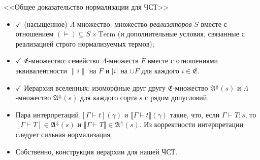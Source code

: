 \documentclass[russian]{beamer}
\begin{document}
\begin{frame}{<<Общее доказательство нормализации для
    ЧСТ>>}
\begin{itemize}
    \item $\checkmark$ (насыщенное) $\Lambda$-множество:
        множество \textit{реализаторов} $S$ вместе с
        отношением
        $(\vDash)\subseteq S\times\mathrm{Term}$ (и
        дополнительные условия, связанные с реализацией
        строго нормализуемых термов);
    \item $\checkmark$ $\mathfrak{E}$-множество:
        семейство $\Lambda$-множеств $F$ вместе с
        отношениями эквивалентности $\|i\|$ на $F$ и
        $|i|$ на $\cup F$ для каждого
        $i\in\mathfrak{E}$.
    \item $\checkmark$ Иерархия вселенных:
        изоморфные друг другу $\mathfrak{E}$-множество
        $\mathfrak{A}^\Uparrow(s)$ и $\Lambda$-множество
        $\mathfrak{A}^\Downarrow(s)$ для каждого сорта
        $s$ с рядом допусловий.
    \item Пара интерпретаций
        $[\Gamma\vdash t](\gamma)$ и $\llbracket\Gamma
        \vdash t\rrbracket(\gamma)$ такие, что, если
        $\Gamma\vdash T:s$, то
        $[\Gamma\vdash T]\in\mathfrak{A}^\Downarrow(s)$
        и $\llbracket\Gamma\vdash T\rrbracket\in
        \mathfrak{A}^\Uparrow(s)$. Из корректности
        интерпретации следует сильная нормализация.
    \item Собственно, конструкция иерархии для нашей
        ЧСТ.
\end{itemize}
\end{frame}
\end{document}
